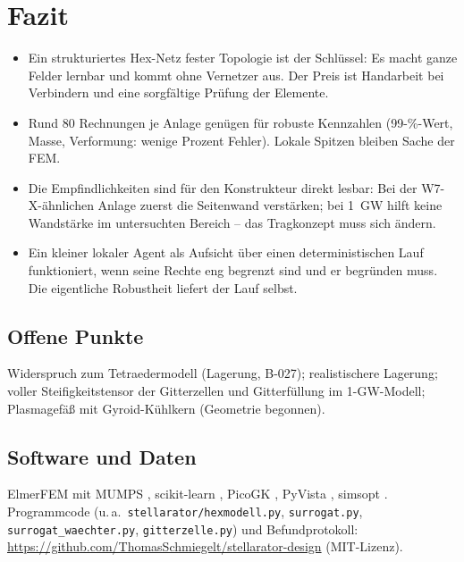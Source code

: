 \documentclass[10pt,a4paper]{article}
\begin{document}
\section{Fazit}
\begin{itemize}
\item Ein strukturiertes Hex-Netz fester Topologie ist der Schlüssel: Es macht ganze Felder lernbar und kommt
  ohne Vernetzer aus. Der Preis ist Handarbeit bei Verbindern und eine sorgfältige Prüfung der Elemente.
\item Rund 80 Rechnungen je Anlage genügen für robuste Kennzahlen (99-\%-Wert, Masse, Verformung: wenige Prozent
  Fehler). Lokale Spitzen bleiben Sache der FEM.
\item Die Empfindlichkeiten sind für den Konstrukteur direkt lesbar: Bei der W7-X-ähnlichen Anlage zuerst die
  Seitenwand verstärken; bei 1~GW hilft keine Wandstärke im untersuchten Bereich -- das Tragkonzept muss sich ändern.
\item Ein kleiner lokaler Agent als Aufsicht über einen deterministischen Lauf funktioniert, wenn seine Rechte
  eng begrenzt sind und er begründen muss. Die eigentliche Robustheit liefert der Lauf selbst.
\end{itemize}
\subsection*{Offene Punkte}
Widerspruch zum Tetraedermodell (Lagerung, B-027); realistischere Lagerung; voller Steifigkeitstensor der
Gitterzellen und Gitterfüllung im 1-GW-Modell; Plasmagefäß mit Gyroid-Kühlkern (Geometrie begonnen).

\subsection*{Software und Daten}
ElmerFEM \cite{elmer} mit MUMPS \cite{mumps}, scikit-learn \cite{sklearn}, PicoGK \cite{picogk}, PyVista
\cite{pyvista}, simsopt \cite{simsopt}. Programmcode (u.\,a.\ \texttt{stellarator/hexmodell.py},
\texttt{surrogat.py}, \texttt{surrogat\_waechter.py}, \texttt{gitterzelle.py}) und Befundprotokoll:
\url{https://github.com/ThomasSchmiegelt/stellarator-design} (MIT-Lizenz).
\end{document}
